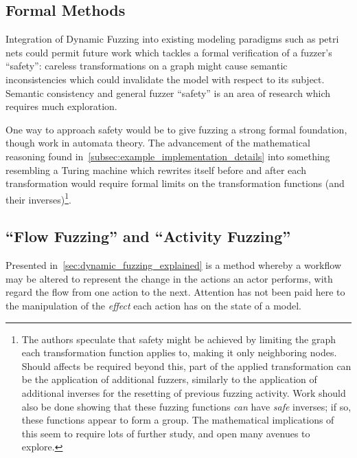 \documentclass[draft,12pt]{llncs}  %
\begin{document}
\subsection{Formal Methods}


Integration of Dynamic Fuzzing into existing modeling paradigms such as petri
nets could permit future work which tackles a formal verification of a fuzzer's
``safety'': careless transformations on a graph might cause semantic
inconsistencies which could invalidate the model with respect to its
subject. Semantic consistency and general fuzzer ``safety'' is an area
of research which requires much exploration.
\par

One way to approach safety would be to give fuzzing a strong formal foundation,
though work in automata theory. The advancement of the mathematical reasoning
found in~\cref{subsec:example_implementation_details} into something resembling
a Turing machine which rewrites itself before and after each transformation
would require formal limits on the transformation functions (and their
inverses)\footnote{The authors speculate that safety might be achieved by
  limiting the graph each transformation function applies to, making it only
  neighboring nodes. Should affects be required beyond this, part of the applied
  transformation can be the application of additional fuzzers, similarly to the
  application of additional inverses for the resetting of previous fuzzing
  activity. Work should also be done showing that these fuzzing functions
  \emph{can} have \emph{safe} inverses; if so, these functions appear to form a
  group. The mathematical implications of this seem to require lots of further
  study, and open many avenues to explore.}.
\par

\subsection{``Flow Fuzzing'' and ``Activity Fuzzing''}
Presented in~\cref{sec:dynamic_fuzzing_explained} is a method whereby a workflow
may be altered to represent the change in the actions an actor performs, with
regard the flow from one action to the next. Attention has not been paid here to
the manipulation of the \emph{effect} each action has on the state of a model.
\par
\end{document}
